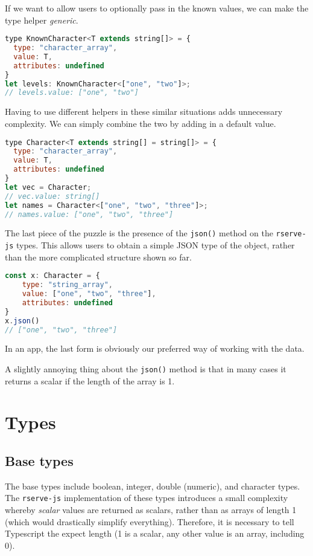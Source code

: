 \documentclass{article}
\newcommand{\pkg}[1]{\texttt{#1}}
\newcommand{\cmd}[1]{\texttt{#1}}
\begin{document}
If we want to allow users to optionally pass in the known values, we can make the type helper \emph{generic}.
\begin{lstlisting}[language=Javascript]
type KnownCharacter<T extends string[]> = {
  type: "character_array",
  value: T,
  attributes: undefined
}
let levels: KnownCharacter<["one", "two"]>;
// levels.value: ["one", "two"]
\end{lstlisting}
Having to use different helpers in these similar situations adds unnecessary complexity.
We can simply combine the two by adding in a default value.
\begin{lstlisting}[language=Javascript]
type Character<T extends string[] = string[]> = {
  type: "character_array",
  value: T,
  attributes: undefined
}
let vec = Character;
// vec.value: string[]
let names = Character<["one", "two", "three"]>;
// names.value: ["one", "two", "three"]
\end{lstlisting}

The last piece of the puzzle is the presence of the \cmd{json()} method on the \pkg{rserve-js} types.
This allows users to obtain a simple JSON type of the object, rather than the more complicated structure shown so far.
\begin{lstlisting}[language=Javascript]
const x: Character = {
    type: "string_array",
    value: ["one", "two", "three"],
    attributes: undefined
}
x.json()
// ["one", "two", "three"]
\end{lstlisting}
In an app, the last form is obviously our preferred way of working with the data.

A slightly annoying thing about the \cmd{json()} method is that in many cases it returns a scalar if the length of the array is 1.


\section{Types}
\label{sec:types}

\subsection{Base types}
\label{sec:base-types}

The base types include boolean, integer, double (numeric), and character types.
The \pkg{rserve-js} implementation of these types introduces a small complexity whereby \emph{scalar} values are returned as scalars, rather than as arrays of length 1 (which would drastically simplify everything). Therefore, it is necessary to tell Typescript the expect length (1 is a scalar, any other value is an array, including 0).
\end{document}
